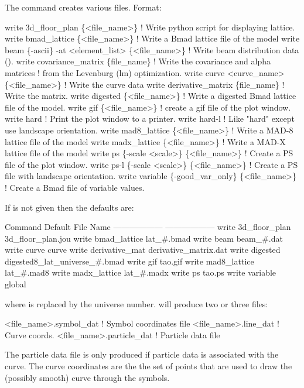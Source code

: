 {{{The  command creates various files.
Format:
\begin{example}
  write 3d_floor_plan \{<file_name>\}      ! Write python script for displaying lattice.
  write bmad_lattice \{<file_name>\}       ! Write a Bmad lattice file of the model
  write beam \{-ascii\} -at <element_list> \{<file_name>\} 
                                         ! Write beam distribution data ().
  write covariance_matrix \{file_name\}    ! Write the covariance and alpha matrices 
                                         !   from the Levenburg (lm) optimization.
  write curve <curve_name> \{<file_name>\} ! Write the curve data
  write derivative_matrix \{file_name\}    ! Write the  matrix.
  write digested \{<file_name>\}     ! Write a digested Bmad lattice file of the model.
  write gif \{<file_name>\}          ! create a gif file of the plot window.
  write hard                       ! Print the plot window to a printer.
  write hard-l                     ! Like "hard" except use landscape orientation. 
  write mad8_lattice \{<file_name>\} ! Write a MAD-8 lattice file of the model
  write madx_lattice \{<file_name>\} ! Write a MAD-X lattice file of the model
  write ps \{-scale <scale>\} \{<file_name>\}      
                                   ! Create a PS file of the plot window.
  write ps-l \{-scale <scale>\} \{<file_name>\}    
                                   ! Create a PS file with landscape orientation.
  write variable \{-good_var_only\} \{<file_name>\} 
                                   ! Create a Bmad file of variable values.
\end{example}

\vskip 0.2in 

If  is not given then the defaults are:
\begin{example}
  Command                        Default File Name
  ------------------             ------------------
  write 3d_floor_plan            3d_floor_plan.jou
  write bmad_lattice             lat_#.bmad
  write beam                     beam_#.dat
  write curve                    curve
  write derivative_mat           derivative_matrix.dat              
  write digested                 digested8_lat_universe_#.bmad
  write gif                      tao.gif
  write mad8_lattice             lat_#.mad8
  write madx_lattice             lat_#.madx
  write ps                       tao.ps
  write variable                 global%
\end{example}
where \vn{\#} is replaced by the universe number.  will produce two or three files: 
\begin{example}
  <file_name>.symbol_dat    ! Symbol coordinates file
  <file_name>.line_dat      ! Curve coords.
  <file_name>.particle_dat  ! Particle data file
\end{example}
The particle data file is only produced if particle
data is associated with the curve.
The curve coordinates are the the set of points that are used to draw the
(possibly smooth) curve through the symbols.

}}}
